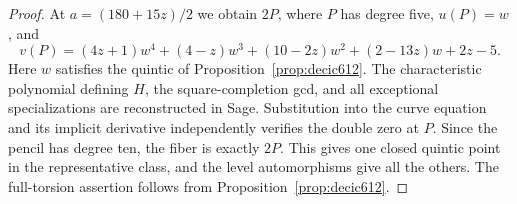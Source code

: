 \begin{proof}
At $a=(180+15z)/2$ we obtain $2P$, where $P$ has degree five,
$u(P)=w$, and
\[
 v(P)=(4z+1)w^4+(4-z)w^3+(10-2z)w^2+(2-13z)w+2z-5.
\]
Here $w$ satisfies the quintic of Proposition~\ref{prop:decic612}.
The characteristic polynomial defining $H$, the square-completion
gcd, and all exceptional specializations are reconstructed in Sage.
Substitution into the curve equation and its implicit derivative
independently verifies the double zero at $P$.
Since the pencil has degree ten, the fiber is exactly $2P$.
This gives one closed quintic point in the representative class,
and the level automorphisms give all the others.
The full-torsion assertion follows from Proposition~\ref{prop:decic612}.
\end{proof}
